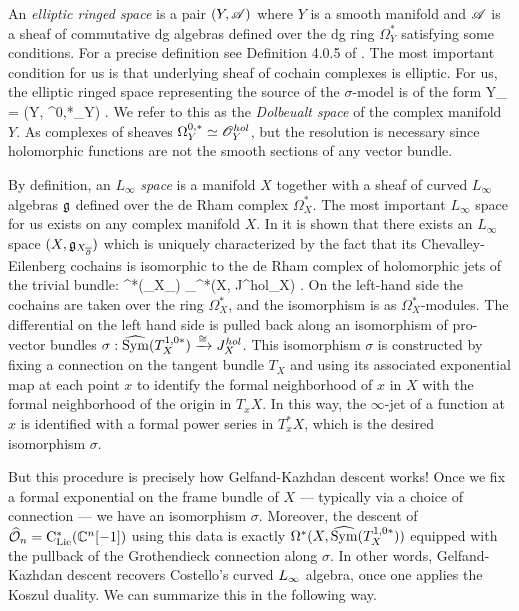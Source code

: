 An {\em elliptic ringed space} is a pair $(Y, \mathscr A)$ where $Y$ is a smooth manifold and $\mathscr A$ is a sheaf of commutative dg algebras defined over the dg ring $\Omega^*_Y$ satisfying some conditions. 
For a precise definition see Definition 4.0.5 of \cite{CostelloHolomorphic}.
The most important condition for us is that underlying sheaf of cochain complexes is elliptic.
For us, the elliptic ringed space representing the source of the $\sigma$-model is of the form
\ben
Y_{\dbar} = (Y, \Omega^{0,*}_Y) .
\een
We refer to this as the {\em Dolbeualt space} of the complex manifold $Y$. 
As complexes of sheaves $\Omega^{0,*}_Y \simeq \mathscr O^{hol}_Y$, but the resolution is necessary since holomorphic functions are not the smooth sections of any vector bundle. 

By definition, an $L_\infty$ {\em space} is a manifold $X$ together with a sheaf of curved $L_\infty$ algebras $\mathfrak g$ defined over the de Rham complex $\Omega^*_X$. 
The most important $L_\infty$ space for us exists on any complex manifold $X$. 
In \cite{WG2} it is shown that there exists an $L_\infty$ space $(X, \mathfrak g_{X_{\overline{\partial}}})$ which is uniquely characterized by the fact that its Chevalley-Eilenberg cochains is isomorphic to the de Rham complex of holomorphic jets of the trivial bundle:
\ben
\clie^*(\fg_{X_{\dbar}}) \cong_\sigma \Omega^*(X, J^{hol}_X) .
\een
On the left-hand side the cochains are taken over the ring $\Omega^*_X$, and the isomorphism is as $\Omega^*_X$-modules.
The differential on the left hand side is pulled back along an isomorphism of pro-vector bundles 
$\sigma: \widehat{{\rm Sym}}(T^{1,0*}_X) \xrightarrow{\cong} J^{hol}_X$.
This isomorphism $\sigma$ is constructed by fixing a connection on the tangent bundle $T_X$
and using its associated exponential map at each point $x$ 
to identify the formal neighborhood of $x$ in $X$ with the formal neighborhood of the origin in $T_x X$.
In this way, the $\infty$-jet of a function at $x$ is identified with a formal power series in $T_x^* X$,
which is the desired isomorphism $\sigma$.

But this procedure is precisely how Gelfand-Kazhdan descent works! 
Once we fix a formal exponential on the frame bundle of $X$ --- typically via a choice of connection --- we have an isomorphism $\sigma$.
Moreover, the descent of $\widehat{\mathcal O}_n = {\rm C}_{{\rm Lie}}^*(\mathbb C^n[-1])$ using this data is exactly $\Omega^*(X, \widehat{{\rm Sym}}(T^{1,0*}_X))$
equipped with the pullback of the Grothendieck connection along $\sigma$.
In other words, Gelfand-Kazhdan descent recovers Costello's curved $\L8$ algebra,
once one applies the Koszul duality.
We can summarize this in the following way.

